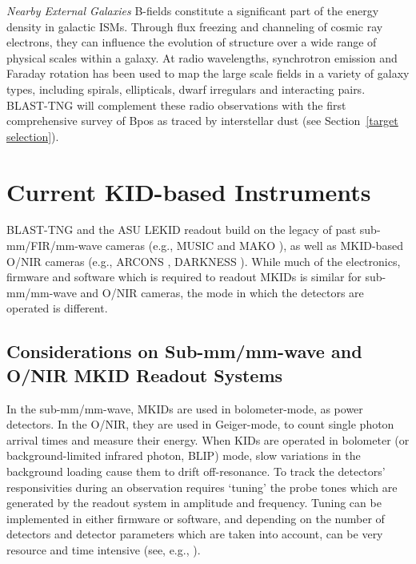 \vspace{5mm}

\textit{Nearby External Galaxies} B-fields constitute a significant part of the energy density in galactic ISMs. Through flux freezing and channeling of cosmic ray electrons, they can influence the evolution of structure over a wide range of physical scales within a galaxy. At radio wavelengths, synchrotron emission and Faraday rotation has been used to map the large scale fields in a variety of galaxy types, including spirals, ellipticals, dwarf irregulars and interacting pairs. BLAST-TNG will complement these radio observations with the first comprehensive survey of \gls{Bpos} as traced by interstellar dust (see Section~\ref{target selection}).

\section{Current KID-based Instruments}\label{kid cameras}

BLAST-TNG and the ASU LEKID readout build on the legacy of past sub-mm/FIR/mm-wave cameras (e.g., MUSIC \citep{golwala2012status} and MAKO \citep{swenson2012mako}), as well as MKID-based O/NIR cameras (e.g., ARCONS \citep{mazin2013arcons}, DARKNESS \citep{meeker2018darkness,strader2016digitial}). While much of the electronics, firmware and software which is required to readout MKIDs is similar for sub-mm/mm-wave and O/NIR cameras, the mode in which the detectors are operated is different.

\subsection{Considerations on Sub-mm/mm-wave and O/NIR MKID Readout Systems}

In the sub-mm/mm-wave, MKIDs are used in bolometer-mode, as power detectors. In the O/NIR, they are used in Geiger-mode, to count single photon arrival times and measure their energy. When KIDs are operated in bolometer (or background-limited infrared photon, BLIP) mode, slow variations in the background loading cause them to drift off-resonance. To track the detectors' responsivities during an observation requires `tuning' the probe tones which are generated by the readout system in amplitude and frequency. Tuning can be implemented in either firmware or software, and depending on the number of detectors and detector parameters which are taken into account, can be very resource and time intensive (see, e.g., \citet{dodkins2018mkid}).

